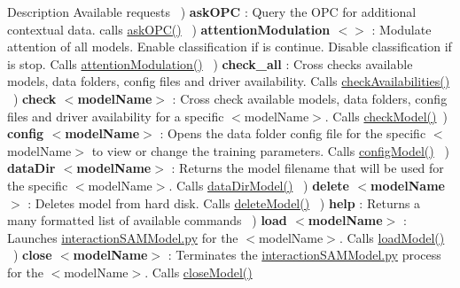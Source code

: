 \begin{DoxyParagraph}{Description}
Available requests ~) {\bfseries ask\+O\+PC} \+: Query the O\+PC for additional contextual data. calls \hyperlink{group__icubclient__SAM__Core_a1d60fc35cdd1c4bc9127dbf2958ebe1c}{ask\+O\+P\+C()} ~) {\bfseries attention\+Modulation $<$$>$} \+: Modulate attention of all models. Enable classification if  is {\ttfamily continue}. Disable classification if  is {\ttfamily stop}. Calls \hyperlink{group__icubclient__SAM__Core_ac1aec51c6d16e7a54ae777aac6ca4293}{attention\+Modulation()} ~) {\bfseries check\+\_\+all} \+: Cross checks available models, data folders, config files and driver availability. Calls \hyperlink{group__icubclient__SAM__Core_aba9c86c4df4a79b54de5194c24f713e3}{check\+Availabilities()} ~) {\bfseries check $<$model\+Name$>$} \+: Cross check available models, data folders, config files and driver availability for a specific $<$model\+Name$>$. Calls \hyperlink{group__icubclient__SAM__Core_a01bb32119da2f5ab62243e538417ec73}{check\+Model()}~) {\bfseries config $<$model\+Name$>$} \+: Opens the data folder config file for the specific $<$model\+Name$>$ to view or change the training parameters. Calls \hyperlink{group__icubclient__SAM__Core_adb7d75e58edc8d351d383a72250f2b48}{config\+Model()} ~) {\bfseries data\+Dir $<$model\+Name$>$} \+: Returns the model filename that will be used for the specific $<$model\+Name$>$. Calls \hyperlink{group__icubclient__SAM__Core_a1e4835426aa35b8e5c8a799d1d42140a}{data\+Dir\+Model()} ~) {\bfseries delete $<$model\+Name$>$} \+: Deletes model from hard disk. Calls \hyperlink{group__icubclient__SAM__Core_a01051c2ab9e4f136dd85dfe420974c6e}{delete\+Model()} ~) {\bfseries help} \+: Returns a many formatted list of available commands ~) {\bfseries load $<$model\+Name$>$} \+: Launches \hyperlink{interactionSAMModel_8py}{interaction\+S\+A\+M\+Model.\+py} for the $<$model\+Name$>$. Calls \hyperlink{group__icubclient__SAM__Core_a1f0530b19957492cfd68befff45b5721}{load\+Model()} ~) {\bfseries close $<$model\+Name$>$} \+: Terminates the \hyperlink{interactionSAMModel_8py}{interaction\+S\+A\+M\+Model.\+py} process for the $<$model\+Name$>$. Calls \hyperlink{group__icubclient__SAM__Core_a17efaa79a4e949060384eb4022e6205a}{close\+Model()} ~\newline

\end{DoxyParagraph}
